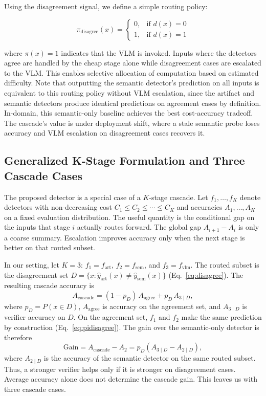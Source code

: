 \documentclass{ieeeaccess}
\begin{document}
Using the disagreement signal, we define a simple routing policy:

\begin{equation}
\pi_{\text{disagree}}(x) =
\begin{cases}
0, & \text{if } d(x) = 0 \\
1, & \text{if } d(x) = 1
\end{cases}
\label{eq:pidisagree}
\end{equation}

where $\pi(x) = 1$ indicates that the VLM is invoked. Inputs where the detectors agree are handled by the cheap stage alone while disagreement cases are escalated to the VLM. This enables selective allocation of computation based on estimated difficulty. Note that outputting the
semantic detector's prediction on all inputs is equivalent to this routing policy without VLM escalation, since the artifact and semantic detectors produce identical predictions on
agreement cases by definition. In-domain, this semantic-only baseline achieves the best
cost-accuracy tradeoff. The cascade's value is under deployment shift, where a stale
semantic probe loses accuracy and VLM escalation on disagreement cases recovers it.

\subsection{Generalized K-Stage Formulation and Three Cascade Cases}
\label{sec:kstage}

The proposed detector is a special case of a $K$-stage cascade. Let
$f_1, \ldots, f_K$ denote detectors with non-decreasing cost
$C_1 \le C_2 \le \cdots \le C_K$ and accuracies $A_1, \ldots, A_K$ on a
fixed evaluation distribution. The useful quantity is the conditional gap
on the inputs that stage $i$ actually routes forward. The global gap
$A_{i+1}-A_i$ is only a coarse summary. Escalation improves accuracy only
when the next stage is better on that routed subset.

In our setting, let $K=3$: $f_1 = f_{\text{art}}$, $f_2 = f_{\text{sem}}$, and
$f_3 = f_{\text{vlm}}$. The routed subset is the disagreement set
$D = \{x : \hat y_{\text{art}}(x) \neq \hat y_{\text{sem}}(x)\}$
(Eq.~\eqref{eq:disagree}). The resulting cascade accuracy is
\begin{equation}
A_{\text{cascade}} = (1-p_D)\, A_{\text{agree}} + p_D\, A_{3\mid D},
\label{eq:decomp}
\end{equation}
where $p_D=P(x\in D)$, $A_{\text{agree}}$ is accuracy on the agreement set,
and $A_{3\mid D}$ is verifier accuracy on $D$. On the agreement set,
$f_1$ and $f_2$ make the same prediction by construction
(Eq.~\eqref{eq:pidisagree}). The gain over the semantic-only detector is
therefore
\begin{equation}
\text{Gain} = A_{\text{cascade}} - A_2
= p_D \left( A_{3\mid D} - A_{2\mid D} \right),
\label{eq:gain}
\end{equation}
where $A_{2\mid D}$ is the accuracy of the semantic detector on the same routed
subset. Thus, a stronger verifier helps only if it is stronger on
disagreement cases. Average accuracy alone does not determine the cascade gain.
This leaves us with three cascade cases.
\end{document}
